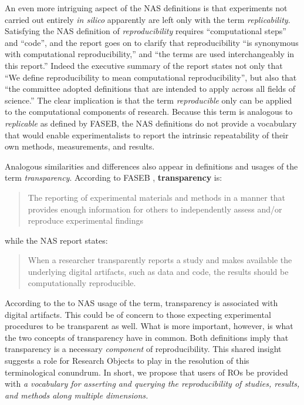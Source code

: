  An even more intriguing aspect of the NAS definitions \cite{committeeonreproducibilityandreplicabilityinscience2019reproducibility} 
	is that experiments not carried out 
	entirely \emph{in silico} apparently are left only with the term \emph{replicability}.  
Satisfying the NAS definition of \emph{reproducibility} requires 
	``computational steps'' and ``code'', and the report goes on to clarify
	that reproducibility ``is synonymous with computational reproducibility,''  and ``the terms are used interchangeably in this report.''
Indeed the executive summary of the report states not only that ``We define reproducibility to mean computational reproducibility'',
	but also that ``the committee adopted definitions that are intended to apply across all fields of science.''
The clear implication is that the term \emph{reproducible} only can be applied to the computational components of research.
Because this term is analogous to \emph{replicable} as defined by FASEB, the NAS definitions do not provide a vocabulary 
	that would enable experimentalists to report the intrinsic repeatability of their own methods, measurements, and results. 

Analogous similarities and differences also appear in definitions and usages of the term \emph{transparency}. 
According to FASEB \cite{FASEB2016enhancing}, \textbf{transparency} is: 
\begin{quote}
	The reporting of experimental materials and methods in a manner that provides enough information 
	for others to independently assess and/or reproduce experimental findings
      \end{quote}
while the NAS report \cite{committeeonreproducibilityandreplicabilityinscience2019reproducibility} states:
 \begin{quote}
	When a researcher transparently reports a study and makes available the underlying digital artifacts, such as data and code, 
	the results should be computationally reproducible.
      \end{quote}
 
\noindent According to the to NAS usage of the term, transparency is associated with digital artifacts.  
This could be of concern to those expecting experimental procedures to be transparent as well.
What is more important, however, is what the two concepts of transparency have in common.
Both definitions imply that transparency is a necessary \emph{component} of reproducibility.
This shared insight suggests a role for Research Objects to play in the resolution of this terminological conundrum.
In short, we propose that users of ROs be provided with \emph{a vocabulary for asserting and querying the reproducibility
          of studies, results, and methods along multiple dimensions.}

